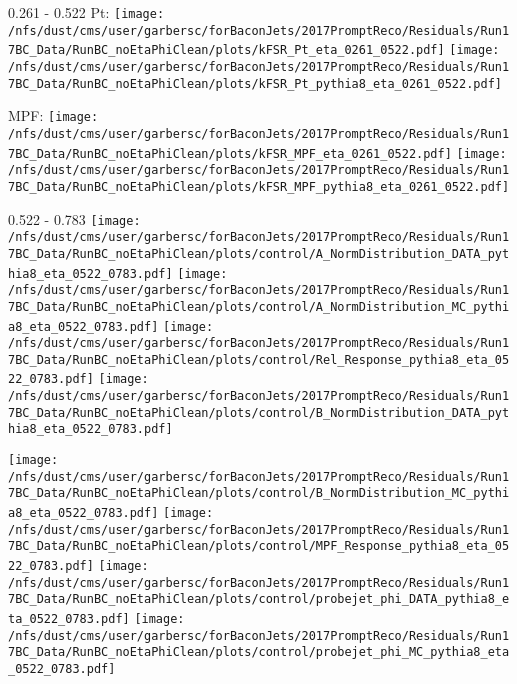 \documentclass[t,compress]{beamer}
\begin{document}
\begin{frame}{0.261 - 0.522}
	 Pt: \texttt{[image: /nfs/dust/cms/user/garbersc/forBaconJets/2017PromptReco/Residuals/Run17BC\_Data/RunBC\_noEtaPhiClean/plots/kFSR\_Pt\_eta\_0261\_0522.pdf]}
	\texttt{[image: /nfs/dust/cms/user/garbersc/forBaconJets/2017PromptReco/Residuals/Run17BC\_Data/RunBC\_noEtaPhiClean/plots/kFSR\_Pt\_pythia8\_eta\_0261\_0522.pdf]}
\newline

	 MPF: \texttt{[image: /nfs/dust/cms/user/garbersc/forBaconJets/2017PromptReco/Residuals/Run17BC\_Data/RunBC\_noEtaPhiClean/plots/kFSR\_MPF\_eta\_0261\_0522.pdf]}
	\texttt{[image: /nfs/dust/cms/user/garbersc/forBaconJets/2017PromptReco/Residuals/Run17BC\_Data/RunBC\_noEtaPhiClean/plots/kFSR\_MPF\_pythia8\_eta\_0261\_0522.pdf]}
\end{frame}

\begin{frame}{0.522 - 0.783}
	\texttt{[image: /nfs/dust/cms/user/garbersc/forBaconJets/2017PromptReco/Residuals/Run17BC\_Data/RunBC\_noEtaPhiClean/plots/control/A\_NormDistribution\_DATA\_pythia8\_eta\_0522\_0783.pdf]}
	\texttt{[image: /nfs/dust/cms/user/garbersc/forBaconJets/2017PromptReco/Residuals/Run17BC\_Data/RunBC\_noEtaPhiClean/plots/control/A\_NormDistribution\_MC\_pythia8\_eta\_0522\_0783.pdf]}
	\texttt{[image: /nfs/dust/cms/user/garbersc/forBaconJets/2017PromptReco/Residuals/Run17BC\_Data/RunBC\_noEtaPhiClean/plots/control/Rel\_Response\_pythia8\_eta\_0522\_0783.pdf]}
	\texttt{[image: /nfs/dust/cms/user/garbersc/forBaconJets/2017PromptReco/Residuals/Run17BC\_Data/RunBC\_noEtaPhiClean/plots/control/B\_NormDistribution\_DATA\_pythia8\_eta\_0522\_0783.pdf]}
\newline

	\texttt{[image: /nfs/dust/cms/user/garbersc/forBaconJets/2017PromptReco/Residuals/Run17BC\_Data/RunBC\_noEtaPhiClean/plots/control/B\_NormDistribution\_MC\_pythia8\_eta\_0522\_0783.pdf]}
	\texttt{[image: /nfs/dust/cms/user/garbersc/forBaconJets/2017PromptReco/Residuals/Run17BC\_Data/RunBC\_noEtaPhiClean/plots/control/MPF\_Response\_pythia8\_eta\_0522\_0783.pdf]}
	\texttt{[image: /nfs/dust/cms/user/garbersc/forBaconJets/2017PromptReco/Residuals/Run17BC\_Data/RunBC\_noEtaPhiClean/plots/control/probejet\_phi\_DATA\_pythia8\_eta\_0522\_0783.pdf]}
	\texttt{[image: /nfs/dust/cms/user/garbersc/forBaconJets/2017PromptReco/Residuals/Run17BC\_Data/RunBC\_noEtaPhiClean/plots/control/probejet\_phi\_MC\_pythia8\_eta\_0522\_0783.pdf]}
\end{frame}
\end{document}
